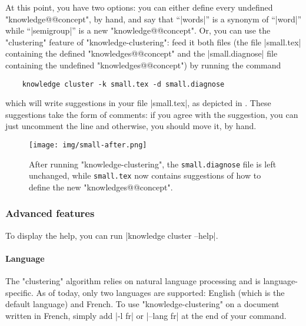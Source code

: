 \documentclass{article}
\begin{document}
At this point, you have two options: you can either define every undefined "knowledge@@concept", by hand, and say that ``\spverb|words|'' is a synonym of
``\spverb|word|'' while ``\spverb|semigroup|'' is a new "knowledge@@concept".
Or, you can use the "clustering" feature of "knowledge-clustering": feed
it both files (the file \spverb|small.tex| containing the defined 
"knowledges@@concept" and
the \spverb|small.diagnose| file containing the undefined "knowledges@@concept")
by running the command
\begin{verbatim}
    knowledge cluster -k small.tex -d small.diagnose
\end{verbatim}
which will write suggestions in your file \spverb|small.tex|,
as depicted in . These suggestions
take the form of comments: if you agree with the suggestion, you can just
uncomment the line and otherwise, you should move it, by hand.

\begin{figure}[htb]
    \centering
    \texttt{[image: img/small-after.png]}
    \caption{%
        \label{fig:clustering-after}
        After running "knowledge-clustering", the \texttt{small.diagnose} file
        is left unchanged, while \texttt{small.tex} now contains suggestions
        of how to define the new "knowledges@@concept".
     }
\end{figure}


\subsubsection{Advanced features}

To display the help, you can run \spverb|knowledge cluster --help|.

\paragraph{Language} The "clustering" algorithm relies on natural language 
processing and is language-specific. As of today, only two languages
are supported: English (which is the default language) and French.
To use "knowledge-clustering" on a document written in French,
simply add \spverb|-l fr| or \spverb|--lang fr| at the end of your command.
\end{document}
